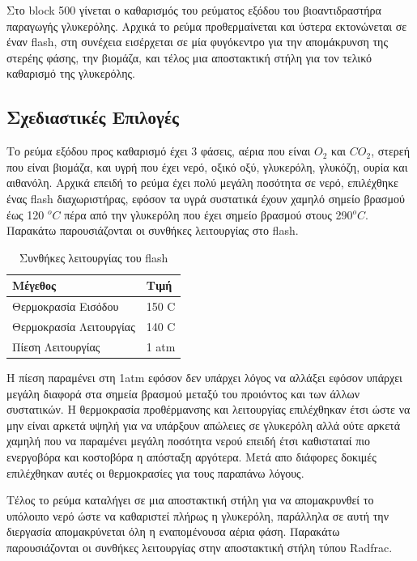 \documentclass[11pt]{article}
\begin{document}
Στο block 500 γίνεται ο καθαρισμός του ρεύματος εξόδου του
βιοαντιδραστήρα παραγωγής γλυκερόλης. Αρχικά το ρεύμα προθερμαίνεται
και ύστερα εκτονώνεται σε έναν flash, στη συνέχεια εισέρχεται σε μία
φυγόκεντρο για την απομάκρυνση της στερέης φάσης, την βιομάζα, και τέλος
μια αποστακτική στήλη για τον τελικό καθαρισμό της γλυκερόλης.

\subsection{Σχεδιαστικές Επιλογές}
\label{sec:org9619287}
Το ρεύμα εξόδου προς καθαρισμό έχει 3 φάσεις, αέρια που είναι \(O_2\)
και \(CO_2\), στερεή που είναι βιομάζα, και υγρή που έχει νερό, οξικό
οξύ, γλυκερόλη, γλυκόζη, ουρία και αιθανόλη. Αρχικά επειδή το ρεύμα
έχει πολύ μεγάλη ποσότητα σε νερό, επιλέχθηκε ένας flash διαχωριστήρας,
εφόσον τα υγρά συστατικά έχουν χαμηλό σημείο βρασμού έως 120 \(^{o} C\)
πέρα από την γλυκερόλη που έχει σημείο βρασμού στους 290\(^{o} C\).
Παρακάτω παρουσιάζονται οι συνθήκες λειτουργίας στο flash.

\begin{table}[htbp]
\caption{Συνθήκες λειτουργίας του flash}
\centering
\begin{tabular}{ll}
Μέγεθος & Τιμή\\
\hline
Θερμοκρασία Εισόδου & 150 C\\
Θερμοκρασία Λειτουργίας & 140 C\\
Πίεση Λειτουργίας & 1 atm\\
\end{tabular}
\end{table}

Η πίεση παραμένει στη 1atm εφόσον δεν υπάρχει λόγος να αλλάξει εφόσον
υπάρχει μεγάλη διαφορά στα σημεία βρασμού μεταξύ του προιόντος και των
άλλων συστατικών. Η θερμοκρασία προθέρμανσης και λειτουργίας επιλέχθηκαν
έτσι ώστε να μην είναι αρκετά υψηλή για να υπάρξουν απώλειες σε
γλυκερόλη αλλά ούτε αρκετά χαμηλή που να παραμένει μεγάλη ποσότητα
νερού επειδή έτσι καθισταταί πιο ενεργοβόρα και κοστοβόρα η απόσταξη
αργότερα. Μετά απο διάφορες δοκιμές επιλέχθηκαν αυτές οι θερμοκρασίες
για τους παραπάνω λόγους.

Τέλος το ρεύμα καταλήγει σε μια αποστακτική στήλη για να απομακρυνθεί το
υπόλοιπο νερό ώστε να καθαριστεί πλήρως η γλυκερόλη, παράλληλα σε
αυτή την διεργασία απομακρύνεται όλη η εναπομένουσα αέρια φάση. Παρακάτω
παρουσιάζονται οι συνθήκες λειτουργίας στην αποστακτική στήλη τύπου
Radfrac.
\end{document}

